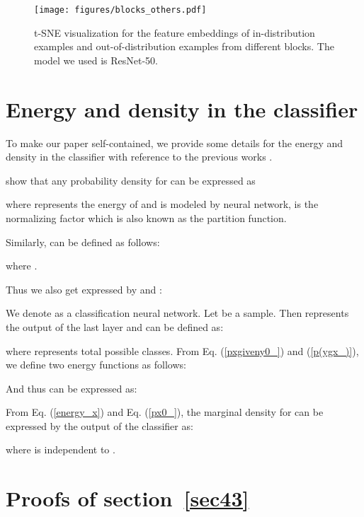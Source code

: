 \documentclass{article}
\begin{document}
\begin{figure}[htbp]
\centering
\texttt{[image: figures/blocks\_others.pdf]}
\caption{t-SNE visualization for the feature embeddings of in-distribution examples and out-of-distribution examples from different blocks. The model we used is ResNet-50.}
\label{img:other_blocks}
\end{figure}


\section{Energy and density in the classifier}\label{App:energy}

 To make our paper self-contained, we provide some details for the energy and density in the classifier with reference to the previous works \cite{energyrobust,grathwohl2019your,liu2020energy}.

\citet{lecun2006} show that any probability density  for  can be expressed as
   
where  represents the energy of  and is modeled by neural network,  is the normalizing factor which is also known as the partition function.

Similarly,  can be defined as follows:

where .

Thus we also get  expressed by  and :



We denote  as a classification neural network. Let  be a sample. Then  represents the  output of the last layer and  can be defined as:

where  represents total possible classes. 
From Eq. (\ref{pxgiveny0_}) and (\ref{p(ygx_)}), we define two energy functions as follows:

And thus  can be expressed as:


From Eq. (\ref{energy_x}) and Eq. (\ref{px0_}), the marginal density  for  can be expressed by the output of the classifier as:
   
where  is independent to .

\section{Proofs of section~\ref{sec43}}\label{App:proof}
\end{document}
